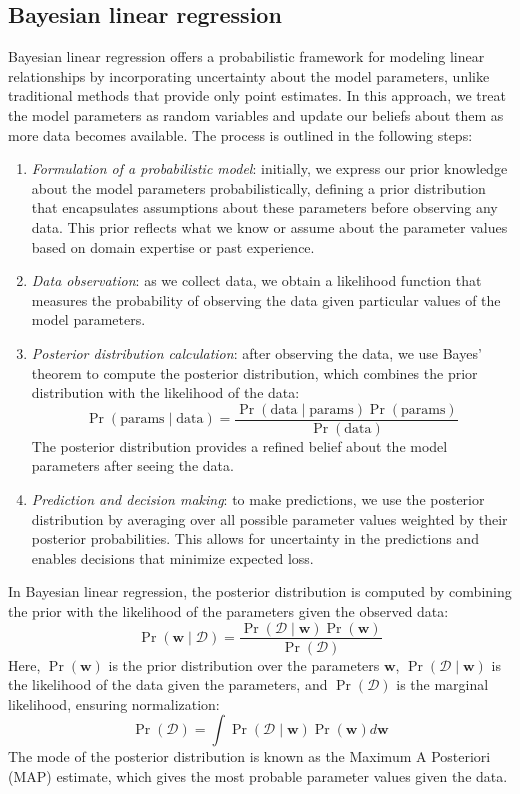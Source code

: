 \subsection{Bayesian linear regression}
Bayesian linear regression offers a probabilistic framework for modeling linear relationships by incorporating uncertainty about the model parameters, unlike traditional methods that provide only point estimates. 
In this approach, we treat the model parameters as random variables and update our beliefs about them as more data becomes available.
The process is outlined in the following steps:
\begin{enumerate}
    \item \textit{Formulation of a probabilistic model}: initially, we express our prior knowledge about the model parameters probabilistically, defining a prior distribution that encapsulates assumptions about these parameters before observing any data. 
        This prior reflects what we know or assume about the parameter values based on domain expertise or past experience.
    \item \textit{Data observation}: as we collect data, we obtain a likelihood function that measures the probability of observing the data given particular values of the model parameters.
    \item \textit{Posterior distribution calculation}: after observing the data, we use Bayes' theorem to compute the posterior distribution, which combines the prior distribution with the likelihood of the data:
        \[\Pr(\text{params}\mid\text{data})=\dfrac{\Pr(\text{data}\mid\text{params})\Pr(\text{params})}{\Pr(\text{data})}\]
        The posterior distribution provides a refined belief about the model parameters after seeing the data.
    \item \textit{Prediction and decision making}: to make predictions, we use the posterior distribution by averaging over all possible parameter values weighted by their posterior probabilities. 
        This allows for uncertainty in the predictions and enables decisions that minimize expected loss.
\end{enumerate}
In Bayesian linear regression, the posterior distribution is computed by combining the prior with the likelihood of the parameters given the observed data:
\[\Pr(\mathbf{w}\mid\mathcal{D})=\dfrac{\Pr(\mathcal{D}\mid\mathbf{w})\Pr(\mathbf{w})}{\Pr(\mathcal{D})}\]
Here, $\Pr(\mathbf{w})$ is the prior distribution over the parameters $\mathbf{w}$, $\Pr(\mathcal{D}\mid\mathbf{w})$ is the likelihood of the data given the parameters, and $\Pr(\mathcal{D})$ is the marginal likelihood, ensuring normalization:
\[\Pr(\mathcal{D})=\int\Pr(\mathcal{D}\mid\mathbf{w})\Pr(\mathbf{w})d\mathbf{w}\] 
The mode of the posterior distribution is known as the Maximum A Posteriori (MAP) estimate, which gives the most probable parameter values given the data.


